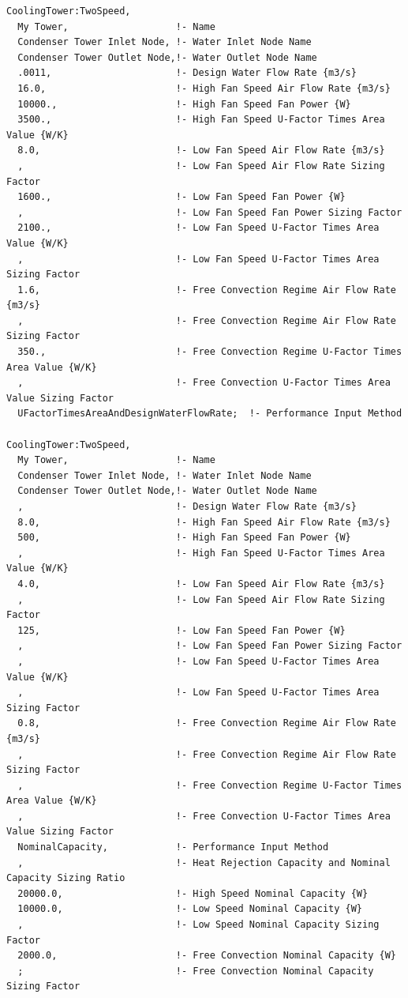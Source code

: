 \begin{lstlisting}
CoolingTower:TwoSpeed,
  My Tower,                   !- Name
  Condenser Tower Inlet Node, !- Water Inlet Node Name
  Condenser Tower Outlet Node,!- Water Outlet Node Name
  .0011,                      !- Design Water Flow Rate {m3/s}
  16.0,                       !- High Fan Speed Air Flow Rate {m3/s}
  10000.,                     !- High Fan Speed Fan Power {W}
  3500.,                      !- High Fan Speed U-Factor Times Area Value {W/K}
  8.0,                        !- Low Fan Speed Air Flow Rate {m3/s}
  ,                           !- Low Fan Speed Air Flow Rate Sizing Factor
  1600.,                      !- Low Fan Speed Fan Power {W}
  ,                           !- Low Fan Speed Fan Power Sizing Factor
  2100.,                      !- Low Fan Speed U-Factor Times Area Value {W/K}
  ,                           !- Low Fan Speed U-Factor Times Area Sizing Factor
  1.6,                        !- Free Convection Regime Air Flow Rate {m3/s}
  ,                           !- Free Convection Regime Air Flow Rate Sizing Factor
  350.,                       !- Free Convection Regime U-Factor Times Area Value {W/K}
  ,                           !- Free Convection U-Factor Times Area Value Sizing Factor
  UFactorTimesAreaAndDesignWaterFlowRate;  !- Performance Input Method

CoolingTower:TwoSpeed,
  My Tower,                   !- Name
  Condenser Tower Inlet Node, !- Water Inlet Node Name
  Condenser Tower Outlet Node,!- Water Outlet Node Name
  ,                           !- Design Water Flow Rate {m3/s}
  8.0,                        !- High Fan Speed Air Flow Rate {m3/s}
  500,                        !- High Fan Speed Fan Power {W}
  ,                           !- High Fan Speed U-Factor Times Area Value {W/K}
  4.0,                        !- Low Fan Speed Air Flow Rate {m3/s}
  ,                           !- Low Fan Speed Air Flow Rate Sizing Factor
  125,                        !- Low Fan Speed Fan Power {W}
  ,                           !- Low Fan Speed Fan Power Sizing Factor
  ,                           !- Low Fan Speed U-Factor Times Area Value {W/K}
  ,                           !- Low Fan Speed U-Factor Times Area Sizing Factor
  0.8,                        !- Free Convection Regime Air Flow Rate {m3/s}
  ,                           !- Free Convection Regime Air Flow Rate Sizing Factor
  ,                           !- Free Convection Regime U-Factor Times Area Value {W/K}
  ,                           !- Free Convection U-Factor Times Area Value Sizing Factor
  NominalCapacity,            !- Performance Input Method
  ,                           !- Heat Rejection Capacity and Nominal Capacity Sizing Ratio
  20000.0,                    !- High Speed Nominal Capacity {W}
  10000.0,                    !- Low Speed Nominal Capacity {W}
  ,                           !- Low Speed Nominal Capacity Sizing Factor
  2000.0,                     !- Free Convection Nominal Capacity {W}
  ;                           !- Free Convection Nominal Capacity Sizing Factor


\end{lstlisting}
